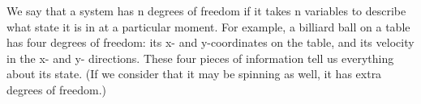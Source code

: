 We say that a system has n degrees of freedom if it takes n variables
to describe what state it is in at a particular moment. For example,
a billiard ball on a table has four degrees of freedom: its x- and y-coordinates
on the table, and its velocity in the x- and y- directions. These four pieces of
information tell us everything about its state. (If we consider that it may
be spinning as well, it has extra degrees of freedom.)